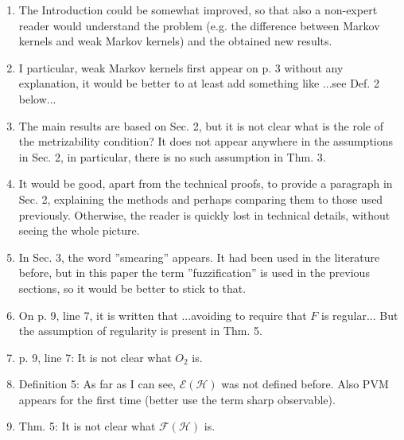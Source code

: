\documentclass[12pt]{article}
\begin{document}
\begin{enumerate}
\item  The Introduction could be somewhat improved, so that also a non-expert  reader
would understand the problem (e.g. the difference between Markov kernels and weak Markov
kernels)  and the obtained new results.
\item I particular, weak Markov kernels first appear on p. 3 without any explanation, it
would be better to at least add something like ...see Def. 2 below...

\item The main results are based on Sec. 2, but it is not clear what is the role of the
metrizability condition? It does not appear anywhere in the assumptions in Sec. 2, in
particular, there is no such assumption in Thm. 3. 

\item It would be good, apart from the technical proofs, to provide a paragraph in Sec. 2,
explaining the methods and perhaps comparing them to those used previously. Otherwise, the
reader is quickly lost in technical details, without seeing the whole picture.

\item In Sec. 3, the word ''smearing'' appears. It had been  used in the literature
before, but in this paper the term ''fuzzification'' is used in the previous sections, so
it would be better to stick to that.

\item On p. 9, line 7, it is written that ...avoiding to require that $F$ is regular...
But the assumption of regularity is present in Thm. 5.

\item p. 9, line 7: It is not clear what $O_2$ is.

\item  Definition 5: As far as I can see, $\mathcal E(\mathcal  H)$ was not defined
before. Also PVM appears for the first time (better use the term sharp observable).

\item Thm. 5: It is not clear what $\mathcal F(\mathcal H)$ is.





\end{enumerate}
\end{document}
